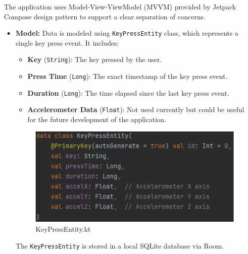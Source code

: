 The application uses Model-View-ViewModel (MVVM) provided by Jetpack Compose design pattern to support a clear separation of concerns. 
\begin{itemize}
	\item \textbf{Model:} Data is modeled using \texttt{KeyPressEntity} class, which represents a single key press event. It includes: 
	\begin{itemize}
		\item \textbf{Key} (\texttt{String}): The key pressed by the user.
		\item \textbf{Press Time} (\texttt{Long}): The exact timestamp of the key press event.
		\item \textbf{Duration} (\texttt{Long}): The time elapsed since the last key press event.
		\item \textbf{Accelerometer Data} (\texttt{Float}): Not used currently but could be useful for the future development of the application.
	\end{itemize}
	\begin{figure}[H]
		\centering
		\includegraphics[width=0.8\linewidth]{images/DataModel.png}
		\caption{KeyPressEntity.kt}
		\label{fig:data_model_view}
	\end{figure}
	
	The \texttt{KeyPressEntity} is stored in a local SQLite database via Room.
	

\end{itemize}
